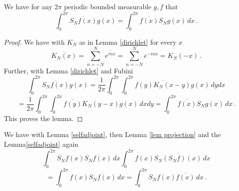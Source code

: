 \begin{lemma}\label{selfadjoint}
    We have for any $2\pi$ periodic bounded measurable $g,f$ that
    \begin{equation}
        \int_0^{2\pi} \overline{S_Nf(x)} g(x)=\int_0^{2\pi} \overline{f(x)} S_Ng(x)\, dx\, .
    \end{equation}
\end{lemma}
\begin{proof}
    We have with $K_N$ as in Lemma \ref{dirichlet} for every $x$
    \begin{equation}
        \overline{K_N(x)}=\sum_{n=-N}^N\overline{ e^{in x}}=
        {\sum_{n=-N}^N e^{-in x}}=K_N(-x)\, .
    \end{equation}
    Further, with Lemma \ref{dirichlet} and Fubini
\begin{equation*}
\int_0^{2\pi} \overline{S_Nf(x)} g(x)
= \frac 1{2\pi} \int_0^{2\pi} \int_{0}^{2\pi}\overline{f(y) K_N(x-y)} g(x)\, dy dx
    \end{equation*}
    \begin{equation}
=
\frac 1{2\pi} \int_0^{2\pi} \int_{0}^{2\pi}\overline{f(y)} K_N(y-x)
g(x)\, dx dy
=\int_0^{2\pi} \overline{f(x)} S_Ng(x)\, dx
\, .
\end{equation}
    This proves the lemma.
\end{proof}



We have with Lemma \ref{selfadjoint}, then Lemma \ref{lem projection} and the Lemma\ref{selfadjoint} again
\begin{equation*}
    \int_0^{2\pi}  S_Nf(x)\overline{S_Nf(x)}\, dx
    \int_0^{2\pi}  f(x)\overline{S_N(S_Nf)(x)}\, dx
\end{equation*}
\begin{equation}\label{eqhil7}
    =\int_0^{2\pi}  f(x)\overline{S_Nf(x)}\, dx=
    \int_0^{2\pi}  S_N f(x)\overline{f(x)}\, dx\, .
\end{equation}

